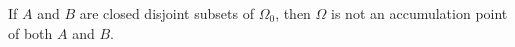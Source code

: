 If $A$ and $B$ are closed disjoint subsets of $\Omega_0$, then $\Omega$ is not an accumulation point of both $A$ and $B$.
